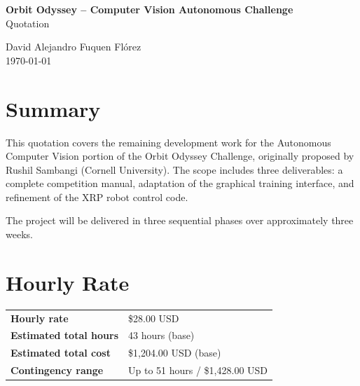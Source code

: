 \documentclass[a4paper]{article}
\begin{document}
\thispagestyle{fancy}

\begin{center}
    \textbf{\large Orbit Odyssey -- Computer Vision Autonomous Challenge} \\[0.3em]
    {\Large Quotation}

    \vspace{1em}

    David Alejandro Fuquen Fl\'orez \\[0.3em]
    {\small \today}
\end{center}

\vspace{1em}

\section*{Summary}

This quotation covers the remaining development work for the Autonomous Computer Vision portion of the Orbit Odyssey Challenge, originally proposed by Rushil Sambangi (Cornell University). The scope includes three deliverables: a complete competition manual, adaptation of the graphical training interface, and refinement of the XRP robot control code.

The project will be delivered in three sequential phases over approximately three weeks.

\section*{Hourly Rate}

\begin{center}
\begin{tabular}{ll}
\toprule
\textbf{Hourly rate} & \$28.00 USD \\
\textbf{Estimated total hours} & 43 hours (base) \\
\textbf{Estimated total cost} & \$1,204.00 USD (base) \\
\textbf{Contingency range} & Up to 51 hours / \$1,428.00 USD \\
\bottomrule
\end{tabular}
\end{center}
\end{document}
